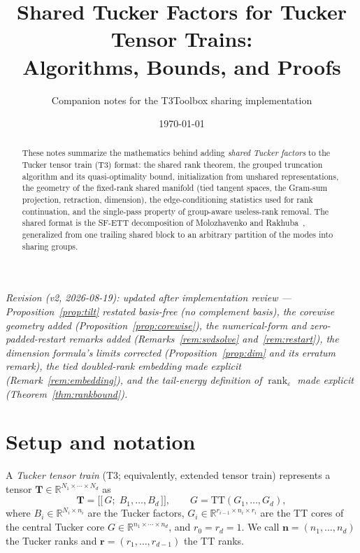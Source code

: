 \documentclass[11pt]{article}
\title{Shared Tucker Factors for Tucker Tensor Trains:\\
Algorithms, Bounds, and Proofs}
\author{Companion notes for the T3Toolbox sharing implementation}
\date{\today}
\theoremstyle{definition}
\theoremstyle{remark}
\newcommand{\R}{\mathbb{R}}
\newcommand{\T}{\boldsymbol{T}}
\newcommand{\rank}{\operatorname{rank}}
\begin{document}
\maketitle

\begin{abstract}
\noindent
These notes summarize the mathematics behind adding \emph{shared Tucker
factors} to the Tucker tensor train (T3) format: the shared rank theorem, the
grouped truncation algorithm and its quasi-optimality bound, initialization
from unshared representations, the geometry of the fixed-rank shared manifold
(tied tangent spaces, the Gram-sum projection, retraction, dimension), the
edge-conditioning statistics used for rank continuation, and the single-pass
property of group-aware useless-rank removal. The shared format is the SF-ETT
decomposition of Molozhavenko and Rakhuba~\cite{MR2026}, generalized from one
trailing shared block to an arbitrary partition of the modes into sharing
groups.
\end{abstract}

\noindent\emph{Revision (v2, 2026-08-19): updated after implementation review
--- Proposition~\ref{prop:tilt} restated basis-free (no complement basis),
the corewise geometry added (Proposition~\ref{prop:corewise}), the
numerical-form and zero-padded-restart remarks added
(Remarks~\ref{rem:svdsolve} and~\ref{rem:restart}), the dimension formula's
limits corrected (Proposition~\ref{prop:dim} and its erratum remark), the
tied doubled-rank embedding made explicit (Remark~\ref{rem:embedding}), and
the tail-energy definition of $\rank_\varepsilon$ made explicit
(Theorem~\ref{thm:rankbound}).}

\section{Setup and notation}\label{sec:setup}

A \emph{Tucker tensor train} (T3; equivalently, extended tensor train)
represents a tensor $\T \in \R^{N_1 \times \cdots \times N_d}$ as
\[
\T = \bigl[\bigl[\, G ;\; B_1, \ldots, B_d \,\bigr]\bigr],
\qquad
G = \mathrm{TT}(G_1, \ldots, G_d),
\]
where $B_i \in \R^{N_i \times n_i}$ are the Tucker factors,
$G_i \in \R^{r_{i-1} \times n_i \times r_i}$ are the TT cores of the central
Tucker core $G \in \R^{n_1 \times \cdots \times n_d}$, and
$r_0 = r_d = 1$. We call $\boldsymbol{n} = (n_1,\ldots,n_d)$ the Tucker ranks
and $\boldsymbol{r} = (r_1,\ldots,r_{d-1})$ the TT ranks.
\end{document}
